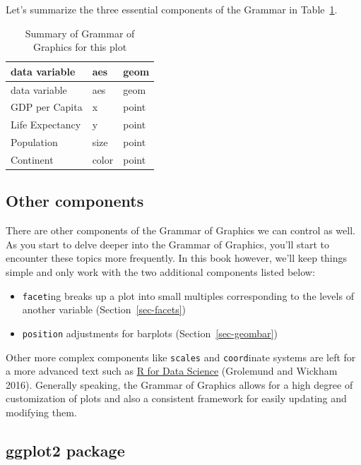 \documentclass[
  letterpaper,
  DIV=11,
  numbers=noendperiod]{scrreprt}
\providecommand{\tightlist}{%
  \setlength{\itemsep}{0pt}\setlength{\parskip}{0pt}}\usepackage{longtable,booktabs,array}
\theoremstyle{definition}
\theoremstyle{remark}
\begin{document}
Let's summarize the three essential components of the Grammar in
Table~\ref{tbl-summary-gapminder}.

\hypertarget{tbl-summary-gapminder}{}
\begin{longtable}[]{@{}lll@{}}
\caption{\label{tbl-summary-gapminder}Summary of Grammar of Graphics for
this plot}\tabularnewline
\toprule\noalign{}
data variable & aes & geom \\
\midrule\noalign{}
\endfirsthead
\toprule\noalign{}
data variable & aes & geom \\
\midrule\noalign{}
\endhead
\bottomrule\noalign{}
\endlastfoot
GDP per Capita & x & point \\
Life Expectancy & y & point \\
Population & size & point \\
Continent & color & point \\
\end{longtable}

\hypertarget{other-components}{%
\subsection{Other components}\label{other-components}}

There are other components of the Grammar of Graphics we can control as
well. As you start to delve deeper into the Grammar of Graphics, you'll
start to encounter these topics more frequently. In this book however,
we'll keep things simple and only work with the two additional
components listed below:

\begin{itemize}
\tightlist
\item
  \texttt{facet}ing breaks up a plot into small multiples corresponding
  to the levels of another variable (Section~\ref{sec-facets})
\item
  \texttt{position} adjustments for barplots (Section~\ref{sec-geombar})
\end{itemize}

Other more complex components like \texttt{scales} and
\texttt{coord}inate systems are left for a more advanced text such as
\href{http://r4ds.had.co.nz/data-visualisation.html\#aesthetic-mappings}{R
for Data Science} (Grolemund and Wickham 2016). Generally speaking, the
Grammar of Graphics allows for a high degree of customization of plots
and also a consistent framework for easily updating and modifying them.

\hypertarget{ggplot2-package}{%
\subsection{ggplot2 package}\label{ggplot2-package}}
\end{document}
